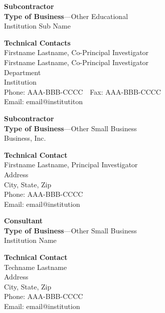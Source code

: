 {\vspace{1em}

\begin{minipage}[t]{0.5\textwidth}
  \textbf{Subcontractor} \\
  \textbf{Type of Business}---Other Educational \\
  Institution Sub Name \\
\end{minipage}
\begin{minipage}[t]{0.5\textwidth}
  \textbf{Technical Contacts} \\
  Firstname Lastname, Co-Principal Investigator \\
  Firstname Lastname, Co-Principal Investigator \\
  Department \\
  Institution \\
  Phone: AAA-BBB-CCCC~~Fax: AAA-BBB-CCCC \\
  Email: email@institutiton
\end{minipage}

\vspace{1em}

\begin{minipage}[t]{0.5\textwidth}
  \textbf{Subcontractor} \\
  \textbf{Type of Business}---Other Small Business \\
  Business, Inc. \\
\end{minipage}
\begin{minipage}[t]{0.5\textwidth}
  \textbf{Technical Contact} \\
  Firstname Lastname, Principal Investigator \\
  Address \\
  City, State, Zip \\
  Phone: AAA-BBB-CCCC \\
  Email: email@institution
  
\end{minipage}

\vspace{1em}

\begin{minipage}[t]{0.5\textwidth}
  \textbf{Consultant} \\
  \textbf{Type of Business}---Other Small Business \\
  Institution Name \\
\end{minipage}
\begin{minipage}[t]{0.5\textwidth}
  \textbf{Technical Contact} \\
  Techname Lastname \\
  Address \\
  City, State, Zip \\
  Phone: AAA-BBB-CCCC \\
  Email: email@institution
\end{minipage}
\vspace{1em}

}
